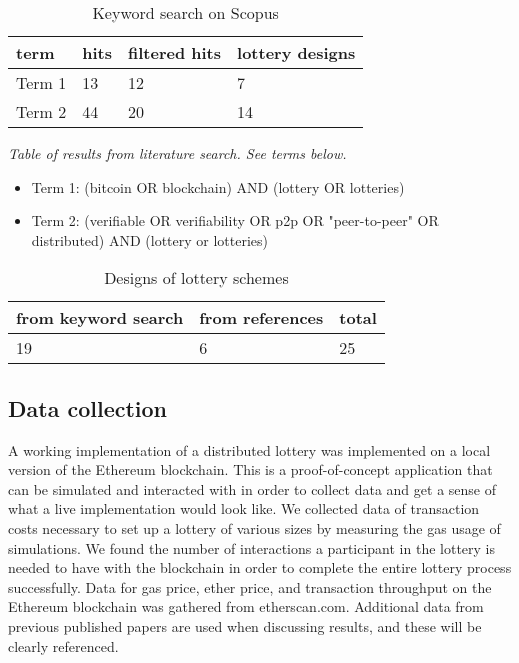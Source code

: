 \begin{table}[h]
\centering
\caption{Keyword search on Scopus}
\begin{tabular}{|l|l|l|l|}
\hline

term & hits & filtered hits & lottery designs \\ \hline
Term 1 & 13 & 12 & 7 \\ \hline
Term 2 & 44 & 20 & 14 \\ \hline

\end{tabular}
\end{table}
\emph{Table of results from literature search. See terms below.}

\begin{itemize}
    \item Term 1: (bitcoin OR blockchain) AND (lottery OR lotteries) 
    \item Term 2: (verifiable OR verifiability OR p2p OR "peer-to-peer" OR distributed) AND (lottery or lotteries)
\end{itemize}

\begin{table}[h]
\centering
\caption{Designs of lottery schemes}
\begin{tabular}{|l|l|l|}
\hline

from keyword search & from references & total \\ \hline
19 & 6 & 25 \\ \hline

\end{tabular}
\end{table}

\subsection{Data collection}

A working implementation of a distributed lottery was implemented on a local version of the Ethereum blockchain. This is a proof-of-concept application that can be simulated and interacted with in order to collect data and get a sense of what a live implementation would look like. 
We collected data of transaction costs necessary to set up a lottery of various sizes by measuring the gas usage of simulations. 
We found the number of interactions a participant in the lottery is needed to have with the blockchain in order to complete the entire lottery process successfully. 
Data for gas price, ether price, and transaction throughput on the Ethereum blockchain was gathered from etherscan.com. 
Additional data from previous published papers are used when discussing results, and these will be clearly referenced.

